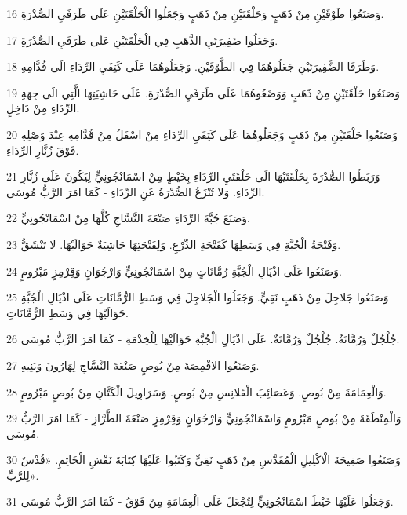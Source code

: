 \par 16 وَصَنَعُوا طَوْقَيْنِ مِنْ ذَهَبٍ وَحَلْقَتَيْنِ مِنْ ذَهَبٍ وَجَعَلُوا الْحَلْقَتَيْنِ عَلَى طَرَفَيِ الصُّدْرَةِ.
\par 17 وَجَعَلُوا ضَفِيرَتَيِ الذَّهَبِ فِي الْحَلْقَتَيْنِ عَلَى طَرَفَيِ الصُّدْرَةِ.
\par 18 وَطَرَفَا الضَّفِيرَتَيْنِ جَعَلُوهُمَا فِي الطَّوْقَيْنِ. وَجَعَلُوهُمَا عَلَى كَتِفَيِ الرِّدَاءِ الَى قُدَّامِهِ.
\par 19 وَصَنَعُوا حَلْقَتَيْنِ مِنْ ذَهَبٍ وَوَضَعُوهُمَا عَلَى طَرَفَيِ الصُّدْرَةِ. عَلَى حَاشِيَتِهَا الَّتِي الَى جِهَةِ الرِّدَاءِ مِنْ دَاخِلٍ.
\par 20 وَصَنَعُوا حَلْقَتَيْنِ مِنْ ذَهَبٍ وَجَعَلُوهُمَا عَلَى كَتِفَيِ الرِّدَاءِ مِنْ اسْفَلُ مِنْ قُدَّامِهِ عِنْدَ وَصْلِهِ فَوْقَ زُنَّارِ الرِّدَاءِ.
\par 21 وَرَبَطُوا الصُّدْرَةَ بِحَلْقَتَيْهَا الَى حَلْقَتَيِ الرِّدَاءِ بِخَيْطٍ مِنْ اسْمَانْجُونِيٍّ لِيَكُونَ عَلَى زُنَّارِ الرِّدَاءِ. وَلا تُنْزَعُ الصُّدْرَةُ عَنِ الرِّدَاءِ - كَمَا امَرَ الرَّبُّ مُوسَى.
\par 22 وَصَنَعَ جُبَّةَ الرِّدَاءِ صَنْعَةَ النَّسَّاجِ كُلَّهَا مِنْ اسْمَانْجُونِيٍّ.
\par 23 وَفَتْحَةُ الْجُبَّةِ فِي وَسَطِهَا كَفَتْحَةِ الدِّرْعِ. وَلِفَتْحَتِهَا حَاشِيَةٌ حَوَالَيْهَا. لا تَنْشَقُّ.
\par 24 وَصَنَعُوا عَلَى اذْيَالِ الْجُبَّةِ رُمَّانَاتٍ مِنْ اسْمَانْجُونِيٍّ وَارْجُوَانٍ وَقِرْمِزٍ مَبْرُومٍ.
\par 25 وَصَنَعُوا جَلاجِلَ مِنْ ذَهَبٍ نَقِيٍّ. وَجَعَلُوا الْجَلاجِلَ فِي وَسَطِ الرُّمَّانَاتِ عَلَى اذْيَالِ الْجُبَّةِ حَوَالَيْهَا فِي وَسَطِ الرُّمَّانَاتِ.
\par 26 جُلْجُلٌ وَرُمَّانَةٌ. جُلْجُلٌ وَرُمَّانَةٌ. عَلَى اذْيَالِ الْجُبَّةِ حَوَالَيْهَا لِلْخِدْمَةِ - كَمَا امَرَ الرَّبُّ مُوسَى.
\par 27 وَصَنَعُوا الاقْمِصَةَ مِنْ بُوصٍ صَنْعَةَ النَّسَّاجِ لِهَارُونَ وَبَنِيهِ.
\par 28 وَالْعِمَامَةَ مِنْ بُوصٍ. وَعَصَائِبَ الْقَلانِسِ مِنْ بُوصٍ. وَسَرَاوِيلَ الْكَتَّانِ مِنْ بُوصٍ مَبْرُومٍ.
\par 29 وَالْمِنْطَقَةَ مِنْ بُوصٍ مَبْرُومٍ وَاسْمَانْجُونِيٍّ وَارْجُوَانٍ وَقِرْمِزٍ صَنْعَةَ الطَّرَّازِ - كَمَا امَرَ الرَّبُّ مُوسَى.
\par 30 وَصَنَعُوا صَفِيحَةَ الْاكْلِيلِ الْمُقَدَّسِ مِنْ ذَهَبٍ نَقِيٍّ وَكَتَبُوا عَلَيْهَا كِتَابَةَ نَقْشِ الْخَاتِمِ. «قُدْسٌ لِلرَّبِّ».
\par 31 وَجَعَلُوا عَلَيْهَا خَيْطَ اسْمَانْجُونِيٍّ لِتُجْعَلَ عَلَى الْعِمَامَةِ مِنْ فَوْقُ - كَمَا امَرَ الرَّبُّ مُوسَى.
